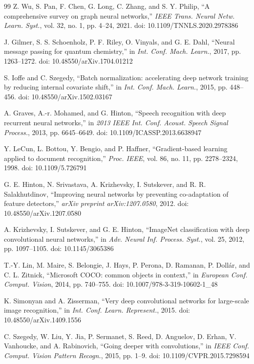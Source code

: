 \documentclass[preprint,12pt]{elsarticle}
\begin{document}
\begin{thebibliography}{99}
 Z. Wu, S. Pan, F. Chen, G. Long, C. Zhang, and S. Y. Philip, ``A comprehensive survey on graph neural networks,'' \textit{IEEE Trans. Neural Netw. Learn. Syst.}, vol. 32, no. 1, pp. 4--24, 2021. doi: 10.1109/TNNLS.2020.2978386

 J. Gilmer, S. S. Schoenholz, P. F. Riley, O. Vinyals, and G. E. Dahl, ``Neural message passing for quantum chemistry,'' in \textit{Int. Conf. Mach. Learn.}, 2017, pp. 1263--1272. doi: 10.48550/arXiv.1704.01212

 S. Ioffe and C. Szegedy, ``Batch normalization: accelerating deep network training by reducing internal covariate shift,'' in \textit{Int. Conf. Mach. Learn.}, 2015, pp. 448--456. doi: 10.48550/arXiv.1502.03167

 A. Graves, A.-r. Mohamed, and G. Hinton, ``Speech recognition with deep recurrent neural networks,'' in \textit{2013 IEEE Int. Conf. Acoust. Speech Signal Process.}, 2013, pp. 6645--6649. doi: 10.1109/ICASSP.2013.6638947

 Y. LeCun, L. Bottou, Y. Bengio, and P. Haffner, ``Gradient-based learning applied to document recognition,'' \textit{Proc. IEEE}, vol. 86, no. 11, pp. 2278--2324, 1998. doi: 10.1109/5.726791

 G. E. Hinton, N. Srivastava, A. Krizhevsky, I. Sutskever, and R. R. Salakhutdinov, ``Improving neural networks by preventing co-adaptation of feature detectors,'' \textit{arXiv preprint arXiv:1207.0580}, 2012. doi: 10.48550/arXiv.1207.0580

 A. Krizhevsky, I. Sutskever, and G. E. Hinton, ``ImageNet classification with deep convolutional neural networks,'' in \textit{Adv. Neural Inf. Process. Syst.}, vol. 25, 2012, pp. 1097--1105. doi: 10.1145/3065386

 T.-Y. Lin, M. Maire, S. Belongie, J. Hays, P. Perona, D. Ramanan, P. Dollár, and C. L. Zitnick, ``Microsoft COCO: common objects in context,'' in \textit{European Conf. Comput. Vision}, 2014, pp. 740--755. doi: 10.1007/978-3-319-10602-1_48

 K. Simonyan and A. Zisserman, ``Very deep convolutional networks for large-scale image recognition,'' in \textit{Int. Conf. Learn. Represent.}, 2015. doi: 10.48550/arXiv.1409.1556

 C. Szegedy, W. Liu, Y. Jia, P. Sermanet, S. Reed, D. Anguelov, D. Erhan, V. Vanhoucke, and A. Rabinovich, ``Going deeper with convolutions,'' in \textit{IEEE Conf. Comput. Vision Pattern Recogn.}, 2015, pp. 1--9. doi: 10.1109/CVPR.2015.7298594


\end{thebibliography}
\end{document}
